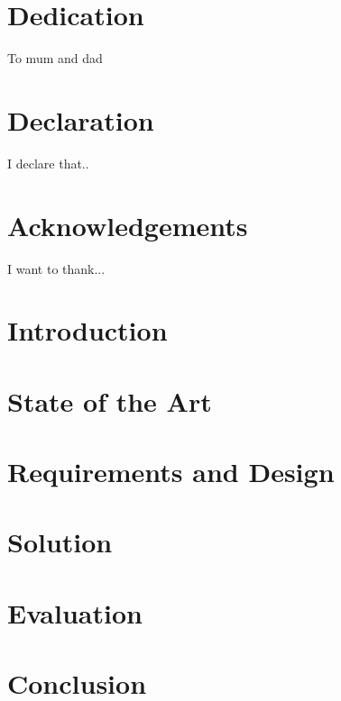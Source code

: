 \documentclass[12pt,twoside]{book}
\begin{document}
\chapter*{Dedication}
To mum and dad

\chapter*{Declaration}
I declare that..

\chapter*{Acknowledgements}
I want to thank...

\tableofcontents
\listoftables
\listoffigures

\chapter{Introduction}


\chapter{State of the Art}


\chapter{Requirements and Design}


\chapter{Solution}


\chapter{Evaluation}


\chapter{Conclusion}



\end{document}
